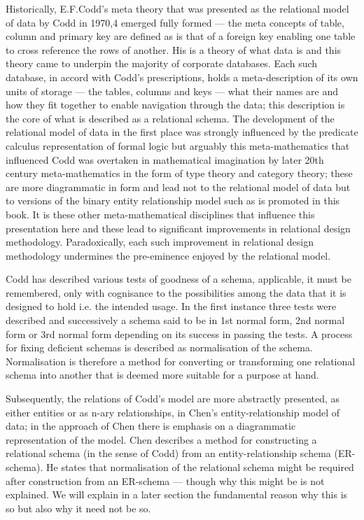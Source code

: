 Historically, E.F.Codd's meta theory that was presented as the relational model of data by Codd in 1970,4 emerged fully formed — the meta concepts of table, column and primary key are defined as is that of a foreign key enabling one table to cross reference the rows of another. His is a theory of what data is and this theory came to underpin the majority of corporate databases. Each such database, in accord with Codd's prescriptions, holds a meta-description of its own units of storage — the tables, columns and keys — what their names are and how they fit together to enable navigation through the data; this description is the core of what is described as a relational schema. The development of the relational model of data in the first place was strongly influenced by the predicate calculus representation of formal logic but arguably this meta-mathematics that influenced Codd was overtaken in mathematical imagination by later 20th century meta-mathematics in the form of type theory and category theory; these are more diagrammatic in form and lead not to the relational model of data but to versions of the binary entity relationship model such as is promoted in this book. It is these other meta-mathematical disciplines that influence this presentation here and these lead to significant improvements in relational design methodology. Paradoxically, each such improvement in relational design methodology undermines the pre-eminence enjoyed by the relational model.

Codd has described various tests of goodness of a schema, applicable, it must be remembered, only with cognisance to the possibilities among the data that it is designed to hold i.e. the intended usage. In the first instance three tests were described and successively a schema said to be in 1st normal form, 2nd normal form or 3rd normal form depending on its success in passing the tests. A process for fixing deficient schemas is described as normalisation of the schema. Normalisation is therefore a method for converting or transforming one relational schema into another that is deemed more suitable for a purpose at hand.

Subsequently, the relations of Codd's model are more abstractly presented, as either entities or as n-ary relationships, in Chen's entity-relationship model of data; in the approach of Chen there is emphasis on a diagrammatic representation of the model. Chen describes a method for constructing a relational schema (in the sense of Codd) from an entity-relationship schema (ER-schema). He states that normalisation of the relational schema might be required after construction from an ER-schema — though why this might be is not explained. We will explain in a later section the fundamental reason why this is so but also why it need not be so.

